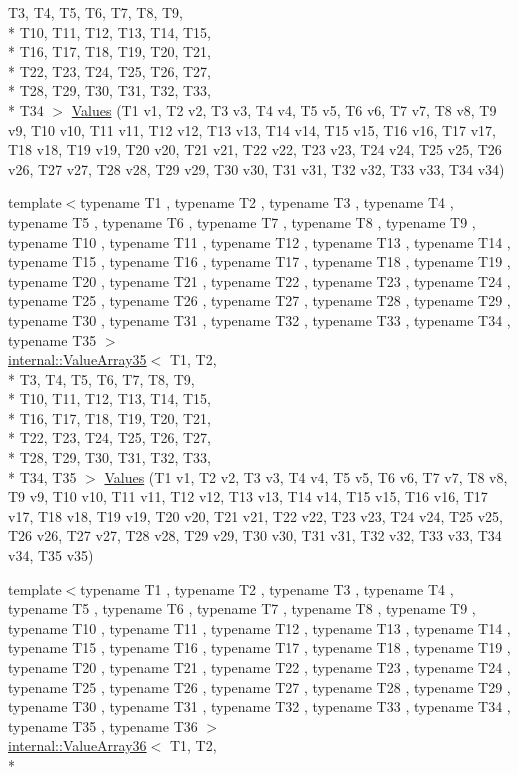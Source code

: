 \begin{DoxyCompactItemize}
T3, T4, T5, T6, T7, T8, T9, \\*
T10, T11, T12, T13, T14, T15, \\*
T16, T17, T18, T19, T20, T21, \\*
T22, T23, T24, T25, T26, T27, \\*
T28, T29, T30, T31, T32, T33, \\*
T34 $>$ \hyperlink{namespacetesting_a37ae9a0b15ed1e02fda22769ef76c97e}{Values} (T1 v1, T2 v2, T3 v3, T4 v4, T5 v5, T6 v6, T7 v7, T8 v8, T9 v9, T10 v10, T11 v11, T12 v12, T13 v13, T14 v14, T15 v15, T16 v16, T17 v17, T18 v18, T19 v19, T20 v20, T21 v21, T22 v22, T23 v23, T24 v24, T25 v25, T26 v26, T27 v27, T28 v28, T29 v29, T30 v30, T31 v31, T32 v32, T33 v33, T34 v34)
\item 
{\footnotesize template$<$typename T1 , typename T2 , typename T3 , typename T4 , typename T5 , typename T6 , typename T7 , typename T8 , typename T9 , typename T10 , typename T11 , typename T12 , typename T13 , typename T14 , typename T15 , typename T16 , typename T17 , typename T18 , typename T19 , typename T20 , typename T21 , typename T22 , typename T23 , typename T24 , typename T25 , typename T26 , typename T27 , typename T28 , typename T29 , typename T30 , typename T31 , typename T32 , typename T33 , typename T34 , typename T35 $>$ }\\\hyperlink{classtesting_1_1internal_1_1ValueArray35}{internal\-::\-Value\-Array35}$<$ T1, T2, \\*
T3, T4, T5, T6, T7, T8, T9, \\*
T10, T11, T12, T13, T14, T15, \\*
T16, T17, T18, T19, T20, T21, \\*
T22, T23, T24, T25, T26, T27, \\*
T28, T29, T30, T31, T32, T33, \\*
T34, T35 $>$ \hyperlink{namespacetesting_a8746425c9d27e46ea5bc5fd77586bc2a}{Values} (T1 v1, T2 v2, T3 v3, T4 v4, T5 v5, T6 v6, T7 v7, T8 v8, T9 v9, T10 v10, T11 v11, T12 v12, T13 v13, T14 v14, T15 v15, T16 v16, T17 v17, T18 v18, T19 v19, T20 v20, T21 v21, T22 v22, T23 v23, T24 v24, T25 v25, T26 v26, T27 v27, T28 v28, T29 v29, T30 v30, T31 v31, T32 v32, T33 v33, T34 v34, T35 v35)
\item 
{\footnotesize template$<$typename T1 , typename T2 , typename T3 , typename T4 , typename T5 , typename T6 , typename T7 , typename T8 , typename T9 , typename T10 , typename T11 , typename T12 , typename T13 , typename T14 , typename T15 , typename T16 , typename T17 , typename T18 , typename T19 , typename T20 , typename T21 , typename T22 , typename T23 , typename T24 , typename T25 , typename T26 , typename T27 , typename T28 , typename T29 , typename T30 , typename T31 , typename T32 , typename T33 , typename T34 , typename T35 , typename T36 $>$ }\\\hyperlink{classtesting_1_1internal_1_1ValueArray36}{internal\-::\-Value\-Array36}$<$ T1, T2, \\*

\end{DoxyCompactItemize}
